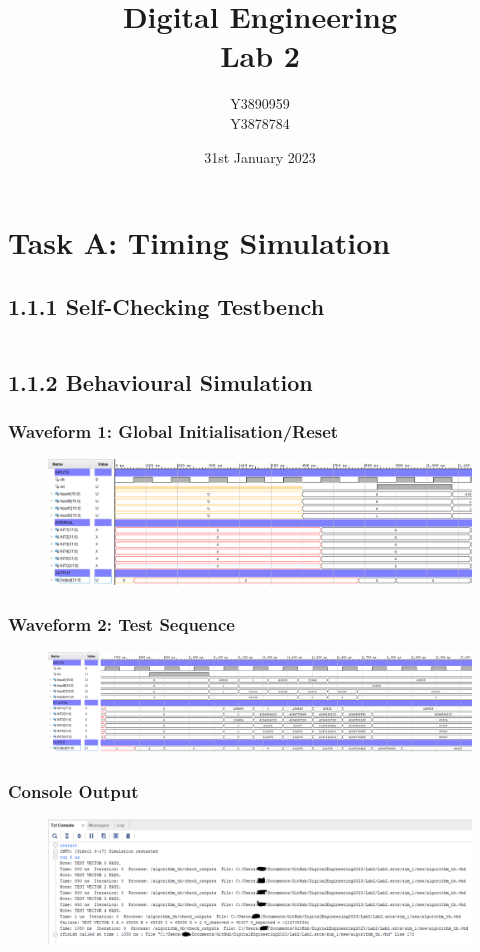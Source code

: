 \documentclass[11pt]{report}
\title{Digital Engineering\\Lab 2}
\author{Y3890959\\Y3878784}
\date{31st January 2023}
\begin{document}
\maketitle

\chapter*{Task A: Timing Simulation}

\section*{1.1.1 Self-Checking Testbench}
\inputminted{vhdl}{../../Lab2/Lab2.srcs/sim_1/new/algorithm_tb.vhd}

\section*{1.1.2 Behavioural Simulation}
\subsection*{Waveform 1: Global Initialisation/Reset}
\begin{figure}[H]
    \includegraphics[width=\columnwidth]{Waveforms/120ns_behavioural_global-reset.png}
\end{figure}
\subsection*{Waveform 2: Test Sequence}
\begin{figure}[H]
    \includegraphics[width=\columnwidth]{Waveforms/120ns_behavioural_test-sequence.png}
\end{figure}
\subsection*{Console Output}
\begin{figure}[H]
    \includegraphics[width=\columnwidth]{Waveforms/120ns_behavioural-console.png}
\end{figure}
\end{document}
